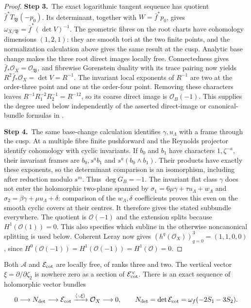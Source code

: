 \begin{proof}
\par\smallskip\noindent\textbf{Step 3.}\ The exact logarithmic tangent sequence has quotient
$\bar f^*T_{\mathfrak B}(-p_0)$.  Its determinant, together with
$W=\bar f^*p_0$, gives
$\omega_{X/\mathfrak B}=\bar f^*(\det V)^{-1}$.
The geometric fibres on the root charts have cohomology dimensions
$(1,2,1)$: they are smooth tori at the two finite points, and the
normalization calculation above gives the same result at the cusp.
Analytic base change makes the three root direct images locally free.
Connectedness gives $\bar f_*\mathcal O_X=\mathcal O_{\mathfrak B}$, and fibrewise
Gorenstein duality with its trace pairing now yields
$R^2\bar f_*\mathcal O_X=\det V=R^{-1}$.  The invariant local exponents
of $R^{-1}$ are two at the order-three point and one at the
order-four point.  Removing these characters leaves
$R^{-1}R_1^{-2}R_2^{-1}=R^{-12}$, so its coarse direct image is
$\mathcal O_B(-1)$.  This supplies the degree used below independently of
the asserted direct-image or canonical-bundle formulas in \cite{AC26}.

\par\smallskip\noindent\textbf{Step 4.}\ The same base-change calculation identifies $\gamma,u_{\Lambda}$ with a
frame through the cusp.  At a multiple fibre finite pushforward and the
Reynolds projector identify cohomology with cyclic invariants.  If $b_0$
and $b_1$ have characters $1,\zeta^{-a}$, their invariant frames are
$b_0,s^ab_1$ and $s^a(b_0\wedge b_1)$.  Their products have exactly
these exponents, so the determinant comparison is an isomorphism,
including after reduction modulo $s^m$.  Thus $\deg G_B=-1$.
The invariant flat class $\gamma$ does not enter the holomorphic
two-plane spanned by
$\sigma_1=6\mu\gamma+\tau u_{\Lambda}+w_{\Lambda}$ and
$\sigma_2=\beta\gamma+\mu u_{\Lambda}+\delta$: comparison of the $w_{\Lambda},\delta$
coefficients proves this even on the smooth cyclic covers at their
centres.  It therefore gives the stated subbundle everywhere.
The quotient is $\mathcal O(-1)$ and the extension splits because
$H^1(\mathcal O(1))=0$.  This also specifies which subline in the otherwise
noncanonical splitting is used below.  Coherent Leray now gives
$(h^q(\mathcal O_X))_{q=0}^3=(1,1,0,0)$, since
$H^0(\mathcal O(-1))=H^1(\mathcal O(-1))=H^1(\mathcal O)=0$.
\end{proof}

\begin{lemma}\label{inv:A1.1}
Both $\mathcal A$ and $\mathcal E_{\rm cot}$ are locally free, of ranks three and
two.  The vertical vector $\xi=\partial/\partial\zeta_2$ is nowhere
zero as a section of $\mathcal E_{\rm cot}^\vee$.  There is an exact sequence
of holomorphic vector bundles
\begin{equation}\label{inv:eq:A-E-line}
0\longrightarrow N_{\rm det}\longrightarrow\mathcal E_{\rm cot}
 \xrightarrow{\langle\cdot,\xi\rangle}\mathcal O_X\longrightarrow0,
\qquad N_{\rm det}=\det\mathcal E_{\rm cot}=\omega_f(-2S_1-3S_2).
\end{equation}
\end{lemma}

